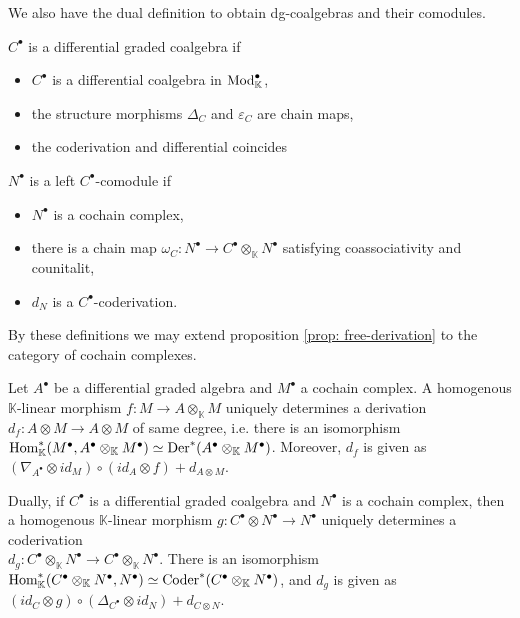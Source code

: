\documentclass[../thesis.tex]{subfiles}
\begin{document}
            We also have the dual definition to obtain dg-coalgebras and their comodules.
            
            \begin{definition}
                $C^{\bullet}$ is a differential graded coalgebra if
                \begin{itemize}
                    \item $C^\bullet$ is a differential coalgebra in $\tt{Mod}_\mathbb{K}^\bullet$,
                    \item the structure morphisms $\Delta_C$ and $\varepsilon_C$ are chain maps,
                    \item the coderivation and differential coincides
                \end{itemize}
            \end{definition}

            \begin{definition}
                $N^\bullet$ is a left $C^\bullet$-comodule if
                \begin{itemize}
                    \item $N^\bullet$ is a cochain complex,
                    \item there is a chain map $\omega_C : N^\bullet \rightarrow C^\bullet \otimes_\mathbb{K} N^\bullet$ satisfying coassociativity and counitalit,
                    \item $d_N$ is a $C^\bullet$-coderivation.
                \end{itemize}
            \end{definition}

            By these definitions we may extend proposition \ref{prop: free-derivation} to the category of cochain complexes.

            \begin{corollary}\label{cor: dg-free-derivation}
                Let $A^\bullet$ be a differential graded algebra and $M^\bullet$ a cochain complex. A homogenous $\mathbb{K}$-linear morphism $f:M\rightarrow A\otimes_{\mathbb{K}} M$ uniquely determines a derivation \\ $d_f:A\otimes M\rightarrow A\otimes M$ of same degree, i.e. there is an isomorphism \\ $\tt{Hom}_{\mathbb{K}}^*(M^\bullet,A^\bullet\otimes_{\mathbb{K}}M^\bullet)\simeq \tt{Der}^*(A^\bullet\otimes_{\mathbb{K}}M^\bullet)$. Moreover, $d_f$ is given as $(\nabla_{A^\bullet}\otimes id_M)\circ (id_A\otimes f) + d_{A\otimes M}$.

                Dually, if $C^\bullet$ is a differential graded coalgebra and $N^\bullet$ is a cochain complex, then a homogenous $\mathbb{K}$-linear morphism $g:C^\bullet\otimes N^\bullet\rightarrow N^\bullet$ uniquely determines a coderivation \\ $d_g:C^\bullet\otimes_{\mathbb{K}}N^\bullet\rightarrow C^\bullet\otimes_{\mathbb{K}}N^\bullet$. There is an isomorphism $\tt{Hom}_{\mathbb{K}}^*(C^\bullet\otimes_{\mathbb{K}}N^\bullet,N^\bullet)\simeq \tt{Coder}^*(C^\bullet\otimes_{\mathbb{K}}N^\bullet)$, and $d_g$ is given as $(id_C\otimes g)\circ (\Delta_{C^\bullet}\otimes id_N) + d_{C\otimes N}$.
            \end{corollary}
\end{document}
